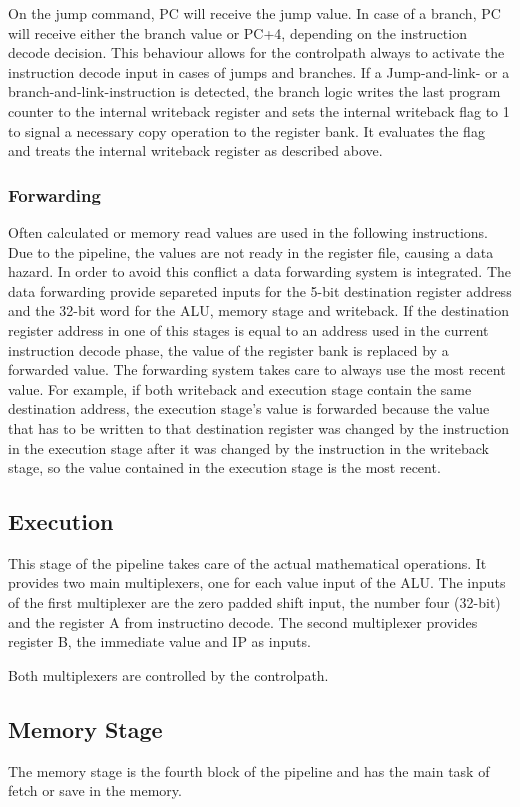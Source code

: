 On the jump command, PC will receive the jump value. 
In case of a branch, PC will receive either the branch value or PC+4, depending on the instruction decode decision. This behaviour allows for the controlpath always to 
activate the instruction decode input in cases of jumps and branches. If a Jump-and-link- or a branch-and-link-instruction is detected, the branch logic writes the last program counter to the internal writeback register and sets the internal writeback flag to 1 to signal a necessary copy operation to the register bank. It evaluates the flag and treats the internal writeback register as described above.
\subsubsection{Forwarding}
Often calculated or memory read values are used in the following instructions. Due to the pipeline, the values are not ready in the register file, causing a data hazard. In order to avoid this conflict
a data forwarding system is integrated. The data forwarding provide separeted inputs for the 5-bit destination register address and the 32-bit word for the ALU, memory stage and writeback. If the destination register address in one of this stages is equal to an address used in the current instruction decode phase, the value of the register bank is replaced by a forwarded value. The forwarding system takes care to always use the most recent value. For example, if both writeback and execution stage contain the same destination address, the execution stage's value is forwarded because the value that has to be written to that destination register was changed by the instruction in the execution stage after it was changed by the instruction in the writeback stage, so the value contained in the execution stage is the most recent.


\subsection{Execution}
This stage of the pipeline takes care of the actual mathematical operations. It provides two main multiplexers, one for each value input of the ALU.
The inputs of the first multiplexer are the zero padded shift input, the number four (32-bit) and the register A from instructino decode. The second multiplexer provides register B, 
the immediate value and IP as inputs.

Both multiplexers are controlled by the controlpath.
\subsection{Memory Stage}
The memory stage is the fourth block of the pipeline and has the main task of fetch or save in the memory. 


